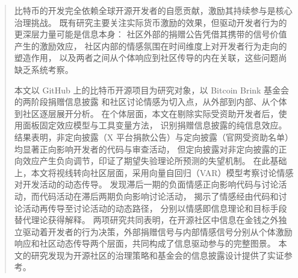 \documentclass[
    type = master, %
    degree = professional,        %
    decl-page,  %
    twoside,                %
    fontset = fandol %
  ]{njuthesis}
\begin{document}

\maketitle
\raggedbottom

\begin{abstract}
比特币的开发完全依赖全球开源开发者的自愿贡献，激励其持续参与是核心治理挑战。
既有研究主要关注实际货币激励的效果，但驱动开发者行为的更深层力量可能是信息本身：
社区外部的捐赠公告凭借其携带的信号价值产生的激励效应，
社区内部的情感氛围在时间维度上对开发者行为走向的塑造作用，
以及两者之间从个体响应到社区传导的内在关联，这些问题尚缺乏系统考察。

本文以 GitHub 上的比特币开源项目为研究对象，以 Bitcoin Brink 基金会的两阶段捐赠信息披露
和社区讨论情感为切入点，从外部到内部、从个体到社区逐层展开分析。
在个体层面，本文在剔除实际受资助开发者后，使用面板固定效应模型与工具变量方法，
识别捐赠信息披露的纯信息效应。
结果表明，非定向披露（X 平台捐款公告）与定向披露（官网受资助名单）均显著正向影响开发者的代码与审查活动，
但定向披露对非定向披露的正向效应产生负向调节，印证了期望失验理论所预测的失望机制。
在此基础上，本文将视线转向社区层面，采用向量自回归（VAR）模型考察讨论情感对开发活动的动态传导。
发现滞后一期的负面情感正向影响代码与讨论活动，而代码活动在滞后两期负向影响讨论活动，
揭示了情感经由代码和讨论活动再传导至讨论活动的动态路径，
分别以情感即信息理论和目标手段替代理论获得解释。
两项研究共同表明，在开源社区中信息在金钱之外独立驱动着开发者的行为决策，外部捐赠信号与内部情感信号分别从个体激励响应和社区动态传导两个层面，共同构成了信息驱动参与的完整图景。
本文的研究发现为开源社区的治理策略和基金会的信息披露设计提供了实证参考。
\end{abstract}
\end{document}
